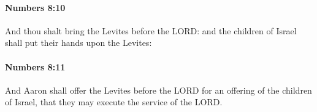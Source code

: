 		\paragraph{Numbers 8:10} %
			\label{NUMBERS-8-10}

			And thou shalt bring the Levites before the LORD: and the children of Israel shall put their hands upon the Levites:


		\paragraph{Numbers 8:11} %
			\label{NUMBERS-8-11}

			And Aaron shall offer the Levites before the LORD for an offering of the children of Israel, that they may execute the service of the LORD.



